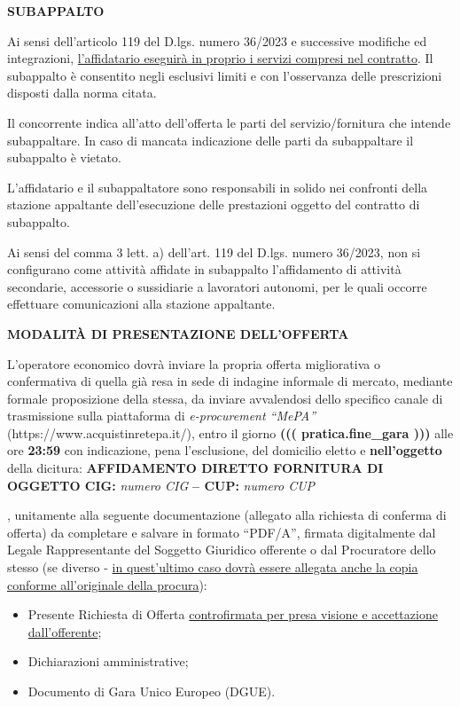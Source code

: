 \documentclass[a4paper,12pt]{letter}
\begin{document}
{\textbf{SUBAPPALTO}

Ai sensi dell’articolo 119 del D.lgs. numero 36/2023 e successive modifiche ed integrazioni,
\underline{l’affidatario eseguirà in proprio i servizi compresi nel contratto}. Il subappalto è consentito negli esclusivi limiti e con l’osservanza delle prescrizioni disposti dalla norma citata. 

Il concorrente indica all’atto dell’offerta le parti del servizio/fornitura che intende subappaltare. In caso di mancata indicazione delle parti da subappaltare il subappalto è vietato. 

L’affidatario e il subappaltatore sono responsabili in solido nei confronti della stazione appaltante dell’esecuzione delle prestazioni oggetto del contratto di subappalto.

Ai sensi del comma 3 lett. a) dell’art. 119 del D.lgs. numero 36/2023, non si configurano come attività affidate in subappalto l’affidamento di attività secondarie, accessorie o sussidiarie a lavoratori autonomi, per le quali occorre effettuare comunicazioni alla stazione appaltante.

\textbf{MODALITÀ DI PRESENTAZIONE DELL’OFFERTA}

L’operatore economico dovrà inviare la propria offerta migliorativa o confermativa di quella già resa in sede di indagine informale di mercato, mediante formale proposizione della stessa, da inviare avvalendosi dello specifico canale di trasmissione sulla piattaforma di \textit{e-procurement “MePA”} (https://www.acquistinretepa.it/), entro il giorno
\textbf{((( pratica.fine_gara )))} alle ore \textbf{23:59}
con indicazione, pena l’esclusione, del domicilio eletto e \textbf{nell’oggetto} della dicitura: \textbf{AFFIDAMENTO DIRETTO FORNITURA DI OGGETTO CIG:} \textit{numero CIG} \textbf{ – CUP:} \textit{numero CUP}}, unitamente alla seguente documentazione (allegato alla richiesta di conferma di offerta) da completare e salvare in formato “PDF/A”, firmata digitalmente dal Legale Rappresentante del Soggetto Giuridico offerente o dal Procuratore dello stesso (se diverso - \underline{in quest’ultimo caso dovrà essere allegata anche la copia conforme all’originale della procura}):

\begin{itemize}
\item Presente Richiesta di Offerta \underline{controfirmata per presa visione e accettazione dall’offerente};
\item Dichiarazioni amministrative;
\item Documento di Gara Unico Europeo (DGUE).
\end{itemize}
\end{document}
